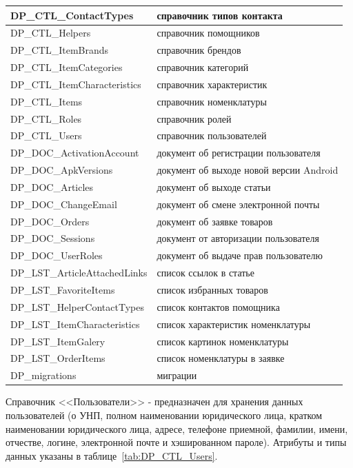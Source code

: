 \begin{table}[!htb]
\begin{tabular}{|p{6cm}|p{11cm}|}
        DP\_CTL\_ContactTypes & справочник типов контакта \\ \hline 
        DP\_CTL\_Helpers & справочник помощников \\ \hline 
        DP\_CTL\_ItemBrands & справочник брендов \\ \hline 
        DP\_CTL\_ItemCategories & справочник категорий \\ \hline 
        DP\_CTL\_ItemCharacteristics & справочник характеристик \\ \hline 
        DP\_CTL\_Items & справочник номенклатуры \\ \hline 
        DP\_CTL\_Roles & справочник ролей \\ \hline 
        DP\_CTL\_Users & справочник пользователей \\ \hline 
        DP\_DOC\_ActivationAccount & документ об регистрации пользователя \\ \hline 
        DP\_DOC\_ApkVersions & документ об выходе новой версии Android \\ \hline 
        DP\_DOC\_Articles & документ об выходе статьи \\ \hline 
        DP\_DOC\_ChangeEmail & документ об смене электронной почты \\ \hline 
        DP\_DOC\_Orders & документ об заявке товаров \\ \hline 
        DP\_DOC\_Sessions & документ от авторизации пользователя \\ \hline 
        DP\_DOC\_UserRoles & документ об выдаче прав пользователю \\ \hline 
        DP\_LST\_ArticleAttachedLinks & список ссылок в статье \\ \hline 
        DP\_LST\_FavoriteItems & список избранных товаров \\ \hline 
        DP\_LST\_HelperContactTypes & список контактов помощника \\ \hline 
        DP\_LST\_ItemCharacteristics & список характеристик номенклатуры \\ \hline 
        DP\_LST\_ItemGalery & список картинок номенклатуры \\ \hline 
        DP\_LST\_OrderItems & список номенклатуры в заявке \\ \hline 
        DP\_migrations& миграции \\ \hline 
    \end{tabular}
\end{table}

Справочник <<Пользователи>> -
предназначен для хранения данных пользователей
(о УНП, полном наименовании юридического лица, кратком наименовании юридического лица,
адресе, телефоне приемной, фамилии, имени, отчестве,
логине, электронной почте и хэшированном пароле).
Атрибуты и типы данных указаны в таблице~\ref{tab:DP_CTL_Users}.

